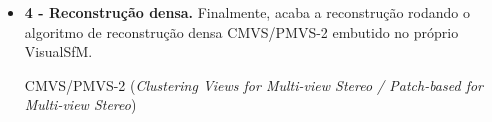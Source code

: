 \begin{itemize}



\item \textbf{4 - Reconstrução densa.} Finalmente, acaba a reconstrução rodando o algoritmo de reconstrução densa CMVS/PMVS-2 embutido no próprio VisualSfM.

CMVS/PMVS-2 ({\it Clustering Views for Multi-view Stereo / Patch-based for Multi-view Stereo})



\end{itemize}
